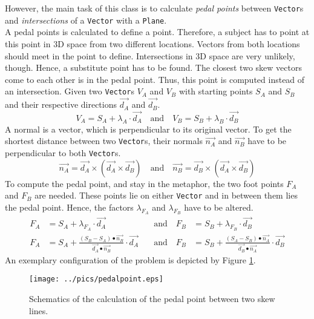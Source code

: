 However, the main task of this class is to calculate \textit{pedal points} between \texttt{Vector}s and \textit{intersections} of a \texttt{Vector} with a \texttt{Plane}. 
\\
A pedal points is calculated to define a point. Therefore, a subject has to point at this point in \ac{3D} space from two different locations. Vectors  from both locations should meet in the point to define. Intersections in \ac{3D} space are very unlikely, though. Hence, a substitute point has to be found. The closest two skew vectors come to each other is in the pedal point. Thus, this point is computed instead of an intersection. Given two \texttt{Vector}s $V_{A}$ and $V_{B}$ with starting points $S_{A}$ and $S_{B}$ and their respective directions $\overrightarrow{d_{A}}$ and $\overrightarrow{d_{B}}$.
$$V_{A} = S_{A} + \lambda_{A} \cdot \overrightarrow{d_{A}} \quad \text{and} \quad V_{B} = S_{B} + \lambda_{B} \cdot \overrightarrow{d_{B}}$$
A normal is a vector, which is perpendicular to its original vector. To get the shortest distance between two \texttt{Vector}s, their normals $\overrightarrow{n_{A}}$ and $\overrightarrow{n_{B}}$ have to be perpendicular to both \texttt{Vector}s. 
$$\overrightarrow{n_{A}} = \overrightarrow{d_{A}} \times (\overrightarrow{d_{A}} \times \overrightarrow{d_{B}}) \quad \text{and} \quad \overrightarrow{n_{B}} = \overrightarrow{d_{B}} \times (\overrightarrow{d_{A}} \times \overrightarrow{d_{B}})$$
To compute the pedal point, and stay in the metaphor, the two foot points $F_{A}$ and $F_{B}$ are needed. These points lie on either \texttt{Vector} and in between them lies the pedal point. Hence, the factors $\lambda_{F_{A}}$ and $\lambda_{F_{B}}$ have to be altered.
\begin{align*}
	F_{A} &= S_{A} + \lambda_{F_{A}} \cdot \overrightarrow{d_{A}} \quad &\text{and} \quad F_{B} &= S_{B} + \lambda_{F_{B}} \cdot \overrightarrow{d_{B}} \\
	F_{A} &= S_{A} + \frac{(S_{B} - S_{A}) \bullet \overrightarrow{n_{B}}}{\overrightarrow{d_{A}} \bullet \overrightarrow{n_{B}}} \cdot \overrightarrow{d_{A}} \quad &\text{and} \quad F_{B} &= S_{B} + \frac{(S_{A} - S_{B}) \bullet \overrightarrow{n_{A}}}{\overrightarrow{d_{B}} \bullet \overrightarrow{n_{A}}} \cdot \overrightarrow{d_{B}} 
\end{align*}
An exemplary configuration of the problem is depicted by Figure \ref{fig:pedal_point}.

\begin{figure}[H]%
\texttt{[image: ../pics/pedalpoint.eps]}%
\caption{Schematics of the calculation of the pedal point between two skew lines.}%
\label{fig:pedal_point} 
\end{figure}

